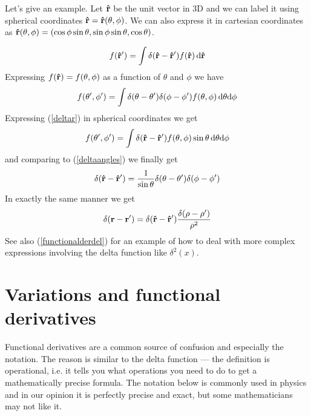 Let's give an example. Let ${\bf\hat r}$ be the unit vector in 3D and we can label it using spherical coordinates ${\bf\hat r}={\bf\hat r}(\theta,\phi)$. We can also express it in cartesian coordinates as ${\bf\hat r}(\theta,\phi)=(\cos\phi\sin\theta,\sin\phi\sin\theta,\cos\theta)$.


\begin{equation}
  f({\bf\hat r'})=\int\delta({\bf\hat r}-{\bf\hat r'})f({\bf\hat r})\,{\rm d} {\bf\hat r}  \label{deltar}
\end{equation}
Expressing $f({\bf\hat r})=f(\theta,\phi)$ as a function of $\theta$ and $\phi$ we have 
\begin{equation}
  f(\theta',\phi')=\int\delta(\theta-\theta')\delta(\phi-\phi') f(\theta,\phi)\,{\rm d}\theta{\rm d}\phi  \label{deltaangles}
\end{equation}
Expressing (\ref{deltar}) in spherical coordinates we get 
\begin{equation*}
  f(\theta',\phi')=\int\delta({\bf\hat r}-{\bf\hat r'}) f(\theta,\phi)\sin\theta\,{\rm d}\theta{\rm d}\phi
\end{equation*}
and comparing to (\ref{deltaangles}) we finally get 
\begin{equation*}
  \delta({\bf\hat r}-{\bf\hat r'})={1\over\sin\theta} \delta(\theta-\theta')\delta(\phi-\phi')
\end{equation*}
In exactly the same manner we get 
\begin{equation*}
  \delta({\bf r}-{\bf r'})=\delta({\bf\hat r}-{\bf\hat r'}) {\delta(\rho-\rho')\over\rho^2}
\end{equation*}
See also (\ref{functionalderdel}) for an example of how to deal with more complex expressions involving the delta function like $\delta^2(x)$.

\section{Variations and functional derivatives}

Functional derivatives are a common source of confusion and especially the
notation. The reason is similar to the delta function --- the definition is
operational, i.e. it tells you what operations you need to do to get a
mathematically precise formula. The notation below is commonly used in physics
and in our opinion it is perfectly precise and exact, but some mathematicians
may not like it.

